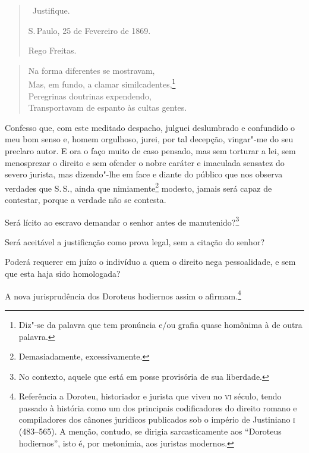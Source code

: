 \begin{quote}
\forceindent\ Justifique.

S.\,Paulo, 25 de Fevereiro de 1869.

Rego Freitas.
\end{quote}


\begin{verse}
Na forma diferentes se mostravam,\\
Mas, em fundo, a clamar similcadentes,\footnote{Diz"-se da palavra que
  tem pronúncia e/ou grafia quase homônima à de outra palavra.}\\
Peregrinas doutrinas expendendo,\\
Transportavam de espanto às cultas gentes.
\end{verse}

Confesso que, com este meditado despacho, julguei deslumbrado e
confundido o meu bom senso e, homem orgulhoso, jurei, por tal decepção,
vingar"-me do seu preclaro autor. E ora o faço muito de caso pensado, mas
sem torturar a lei, sem menosprezar o direito e sem ofender o nobre
caráter e imaculada sensatez do severo jurista, mas dizendo"-lhe em face
e diante do público que nos observa verdades que S.\,S., ainda que
nimiamente\footnote{Demasiadamente, excessivamente.} modesto, jamais
será capaz de contestar, porque a verdade não se contesta.

Será lícito ao escravo demandar o senhor antes de manutenido?\footnote{
  No contexto, aquele que está em posse provisória de sua liberdade.}

Será aceitável a justificação como prova legal, sem a citação do senhor?

Poderá requerer em juízo o indivíduo a quem o direito nega pessoalidade,
e sem que esta haja sido homologada?

A nova jurisprudência dos Doroteus hodiernos assim o afirmam.\footnote{
  Referência a Doroteu, historiador e jurista que viveu no \textsc{vi} século,
  tendo passado à história como um dos principais codificadores do
  direito romano e compiladores dos cânones jurídicos publicados sob o
  império de Justiniano \textsc{i} (483--565). A menção, contudo, se dirigia
  sarcasticamente aos ``Doroteus hodiernos'', isto é, por metonímia, aos
  juristas modernos.}

